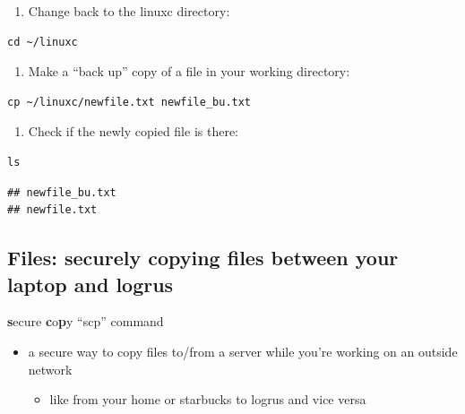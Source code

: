 \documentclass[
]{book}
\providecommand{\tightlist}{%
  \setlength{\itemsep}{0pt}\setlength{\parskip}{0pt}}
\begin{document}
\begin{enumerate}
\def\labelenumi{\arabic{enumi})}
\tightlist
\item
  Change back to the linuxc directory:
\end{enumerate}

\begin{verbatim}
cd ~/linuxc
\end{verbatim}

\begin{enumerate}
\def\labelenumi{\arabic{enumi})}
\setcounter{enumi}{1}
\tightlist
\item
  Make a ``back up'' copy of a file in your working directory:
\end{enumerate}

\begin{verbatim}
cp ~/linuxc/newfile.txt newfile_bu.txt
\end{verbatim}

\begin{enumerate}
\def\labelenumi{\arabic{enumi})}
\setcounter{enumi}{2}
\tightlist
\item
  Check if the newly copied file is there:
\end{enumerate}

\begin{verbatim}
ls
\end{verbatim}

\begin{verbatim}
## newfile_bu.txt
## newfile.txt
\end{verbatim}

\hypertarget{files-securely-copying-files-between-your-laptop-and-logrus}{%
\subsection{Files: securely copying files between your laptop and logrus}\label{files-securely-copying-files-between-your-laptop-and-logrus}}

\textbf{s}ecure \textbf{c}o\textbf{p}y ``scp'' command

\begin{itemize}
\tightlist
\item
  a secure way to copy files to/from a server while you're working on an outside network

  \begin{itemize}
  \tightlist
  \item
    like from your home or starbucks to logrus and vice versa
  \end{itemize}
\end{itemize}
\end{document}
